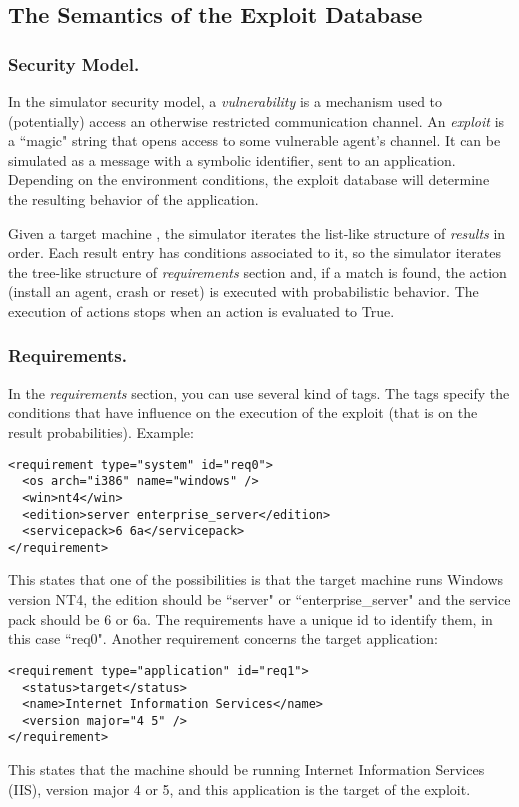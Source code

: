 \documentclass{llncs}
\begin{document}
\subsection{The Semantics of the Exploit Database}

\subsubsection{Security Model.}
In the simulator security model, a \emph{vulnerability} is a mechanism used to (potentially) access an otherwise 
restricted communication channel.
An \emph{exploit} is a ``magic" string that opens access to some vulnerable agent's channel.
It can be simulated as a message with a symbolic identifier, sent to an application.
Depending on the environment conditions, the exploit database will determine the resulting behavior
of the application.

Given a target machine , the simulator iterates the list-like structure of \emph{results} in order. 
Each result entry has conditions associated  to it, so the simulator iterates the tree-like structure of  \emph{requirements}
section and, if a match is found, the action (install an agent, crash or reset) is executed with probabilistic behavior. 
The  execution of actions stops when an action is evaluated to True.
 
\subsubsection{Requirements.}

In the \emph{requirements} section, you can use several kind of  tags. 
The tags specify the conditions that have influence on the execution of the exploit 
(that is on the result probabilities). 
Example:
\begin{verbatim}
<requirement type="system" id="req0">
  <os arch="i386" name="windows" /> 
  <win>nt4</win> 
  <edition>server enterprise_server</edition> 
  <servicepack>6 6a</servicepack> 
</requirement>
\end{verbatim}
This states that one of the possibilities is that the target machine runs  Windows version NT4, 
the edition should be ``server" or ``enterprise\_server" and  the service pack should be 6 or 6a. 
The requirements have a unique id to  identify them, in this case ``req0".
Another requirement concerns the target application:
\begin{verbatim}
<requirement type="application" id="req1">
  <status>target</status> 
  <name>Internet Information Services</name> 
  <version major="4 5" /> 
</requirement>
\end{verbatim}
This states that the machine should be running Internet Information  Services (IIS), version major 4 or 5, 
and this application is the target of the  exploit.
\end{document}
